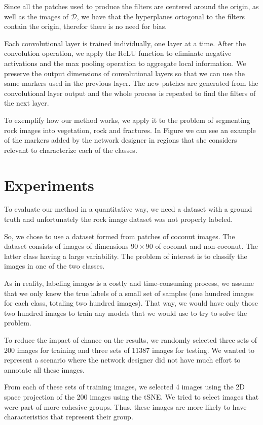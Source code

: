 \documentclass[a4paper,conference]{IEEEtran}
\newcommand{\D}{\mathcal{D}}
\begin{document}
Since all the patches used to produce the filters are centered around the origin, as well as the images of $\D$, we have that the hyperplanes ortogonal to the filters contain the origin, therefor there is no need for bias.

Each convolutional layer is trained individually, one layer at a time. After the convolution operation, we apply the ReLU function to eliminate negative activations and the max pooling operation to aggregate local information. We preserve the output dimensions of convolutional layers so that we can use the same markers used in the previous layer. The new patches are generated from the convolutional layer output and the whole process is repeated to find the filters of the next layer.

To exemplify how our method works, we apply it to the problem of segmenting rock images into vegetation, rock and fractures. In Figure we can see an example of the markers added by the network designer in regions that she considers relevant to characterize each of the classes.

\section{Experiments}
To evaluate our method in a quantitative way, we need a dataset with a ground truth and unfortunately the rock image dataset was not properly labeled.

So, we chose to use a dataset formed from patches of coconut images. The dataset consists of images of dimensions $90 \times 90$ of coconut and non-coconut. The latter class having a large variability. The problem of interest is to classify the images in one of the two classes.

As in reality, labeling images is a costly and time-consuming process, we assume that we only knew the true labels of a small set of samples (one hundred images for each class, totaling two hundred images). That way, we would have only those two hundred images to train any models that we would use to try to solve the problem.

To reduce the impact of chance on the results, we randomly selected three sets of 200 images for training and three sets of 11387 images for testing. We wanted to represent a scenario where the network designer did not have much effort to annotate all these images.

From each of these sets of training images, we selected 4 images using the 2D space projection of the 200 images using the tSNE. We tried to select images that were part of more cohesive groups. Thus, these images are more likely to have characteristics that represent their group.
\end{document}
